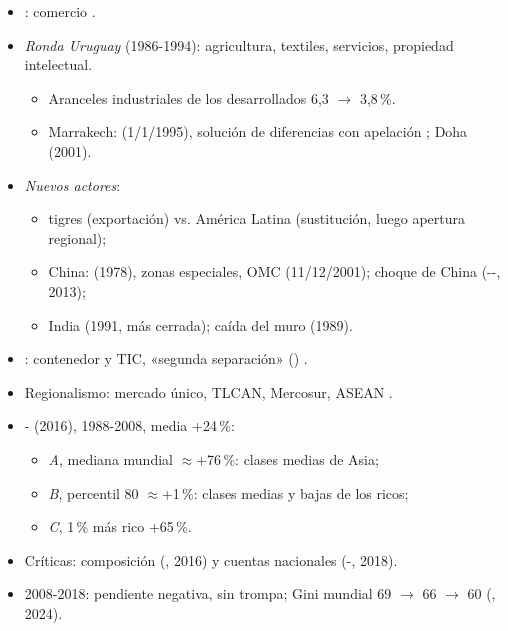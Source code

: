 \documentclass{article}
\begin{document}
\begin{columnas}
\begin{itemize}
\item {}: comercio .
\item \emph{Ronda Uruguay} (1986-1994): agricultura, textiles, servicios, propiedad intelectual.
  \begin{itemize}
  \item Aranceles industriales de los desarrollados 6,3 $\to$ 3,8\,\%.
  \item Marrakech:  (1/1/1995), solución de diferencias con apelación ; Doha (2001).
  \end{itemize}
\item \emph{Nuevos actores}:
  \begin{itemize}
  \item tigres (exportación) vs. América Latina (sustitución, luego apertura regional);
  \item China:  (1978), zonas especiales, OMC (11/12/2001); choque de China (--, 2013);
  \item India (1991, más cerrada); caída del muro (1989).
  \end{itemize}
\item {}: contenedor y TIC, «segunda separación» () .
\item Regionalismo: mercado único, TLCAN, Mercosur, ASEAN .
\end{itemize}
\begin{itemize}
\item {}- (2016), 1988-2008, media +24\,\%:
  \begin{itemize}
  \item \emph{A}, mediana mundial $\approx$+76\,\%: clases medias de Asia;
  \item \emph{B}, percentil 80 $\approx$+1\,\%: clases medias y bajas de los ricos;
  \item \emph{C}, 1\,\% más rico +65\,\%.
  \end{itemize}
\item Críticas: composición (, 2016) y cuentas nacionales (-, 2018).
\item 2008-2018: pendiente negativa, sin trompa; Gini mundial 69 $\to$ 66 $\to$ 60 (, 2024).
\end{itemize}


\end{columnas}
\end{document}

